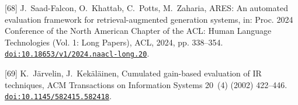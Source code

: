 [68] J.~Saad-Falcon, O.~Khattab, C.~Potts, M.~Zaharia, {ARES}: An automated evaluation framework for retrieval-augmented generation systems, in: Proc. 2024 Conference of the North American Chapter of the ACL: Human Language Technologies (Vol. 1: Long Papers), ACL, 2024, pp. 338--354. \href {https://doi.org/10.18653/v1/2024.naacl-long.20} {\texttt{doi:10.18653/v1/2024.naacl-long.20}}.

[69] K.~J{\"a}rvelin, J.~Kek{\"a}l{\"a}inen, Cumulated gain-based evaluation of {IR} techniques, ACM Transactions on Information Systems 20~(4) (2002) 422--446. \href {https://doi.org/10.1145/582415.582418} {\texttt{doi:10.1145/582415.582418}}.


